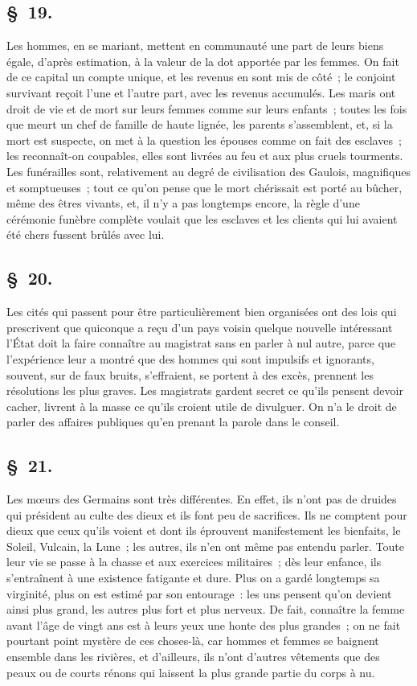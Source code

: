 \documentclass[french,twoside]{book} %
\begin{document}
\subsection[{§ 19.}]{ \textsc{§ 19.} }
\noindent Les hommes, en se mariant, mettent en communauté une part de leurs biens égale, d’après estimation, à la valeur de la dot apportée par les femmes. On fait de ce capital un compte unique, et les revenus en sont mis de côté ; le conjoint survivant reçoit l’une et l’autre part, avec les revenus accumulés. Les maris ont droit de vie et de mort sur leurs femmes comme sur leurs enfants ; toutes les fois que meurt un chef de famille de haute lignée, les parents s’assemblent, et, si la mort est suspecte, on met à la question les épouses comme on fait des esclaves ; les reconnaît-on coupables, elles sont livrées au feu et aux plus cruels tourments. Les funérailles sont, relativement au degré de civilisation des Gaulois, magnifiques et somptueuses ; tout ce qu’on pense que le mort chérissait est porté au bûcher, même des êtres vivants, et, il n’y a pas longtemps encore, la règle d’une cérémonie funèbre complète voulait que les esclaves et les clients qui lui avaient été chers fussent brûlés avec lui.
\subsection[{§ 20.}]{ \textsc{§ 20.} }
\noindent Les cités qui passent pour être particulièrement bien organisées ont des lois qui prescrivent que quiconque a reçu d’un pays voisin quelque nouvelle intéressant l’État doit la faire connaître au magistrat sans en parler à nul autre, parce que l’expérience leur a montré que des hommes qui sont impulsifs et ignorants, souvent, sur de faux bruits, s’effraient, se portent à des excès, prennent les résolutions les plus graves. Les magistrats gardent secret ce qu’ils pensent devoir cacher, livrent à la masse ce qu’ils croient utile de divulguer. On n’a le droit de parler des affaires publiques qu’en prenant la parole dans le conseil.
\subsection[{§ 21.}]{ \textsc{§ 21.} }
\noindent Les mœurs des Germains sont très différentes. En effet, ils n’ont pas de druides qui président au culte des dieux et ils font peu de sacrifices. Ils ne comptent pour dieux que ceux qu’ils voient et dont ils éprouvent manifestement les bienfaits, le Soleil, Vulcain, la Lune ; les autres, ils n’en ont même pas entendu parler. Toute leur vie se passe à la chasse et aux exercices militaires ; dès leur enfance, ils s’entraînent à une existence fatigante et dure. Plus on a gardé longtemps sa virginité, plus on est estimé par son entourage : les uns pensent qu’on devient ainsi plus grand, les autres plus fort et plus nerveux. De fait, connaître la femme avant l’âge de vingt ans est à leurs yeux une honte des plus grandes ; on ne fait pourtant point mystère de ces choses-là, car hommes et femmes se baignent ensemble dans les rivières, et d’ailleurs, ils n’ont d’autres vêtements que des peaux ou de courts rénons qui laissent la plus grande partie du corps à nu.
\end{document}
